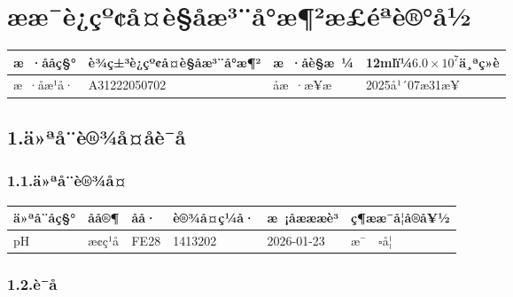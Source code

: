 \documentclass[UTF8,10pt,a4paper,fontset=fandol]{ctexart}
\newcommand{\fieldvalue}[1]{#1}
\newcommand{\handwritten}[1]{#1}
\begin{document}
\newpage

\section*{ææ¯è¿çº¢å¤è§åæ³¨å°æ¶²æ£éªè®°å½}

\begin{tabular}{|p{3cm}|p{5cm}|p{3cm}|p{5cm}|}
\hline
æ ·ååç§° &
\fieldvalue{è¾ç±³è¿çº¢å¤è§åæ³¨å°æ¶²} &
æ ·åè§æ ¼ &
\fieldvalue{12mlï¼$6.0\times10^{7}$ä¸ªç»è}
\\ \hline
æ ·åæ¹å· &
\fieldvalue{\handwritten{A31222050702}} &
åæ ·æ¥æ &
\fieldvalue{\handwritten{2025å¹´07æ31æ¥}}
\\ \hline
\end{tabular}

\subsection*{1.\quad ä»ªå¨è®¾å¤åè¯å}

\subsubsection*{1.1.\quad ä»ªå¨è®¾å¤}

\begin{tabular}{|p{2.2cm}|p{2.7cm}|p{2.2cm}|p{2.7cm}|p{3cm}|p{2.8cm}|}
\hline
ä»ªå¨åç§° & åå®¶ & åå· & è®¾å¤ç¼å· & æ ¡åæææè³ & ç¶ææ¯å¦å®å¥½
\\ \hline
\fieldvalue{pH} &
\fieldvalue{æ¢ç¹å} &
\fieldvalue{FE28} &
\fieldvalue{1413202} &
\fieldvalue{\handwritten{2026-01-23}} &
\fieldvalue{æ¯}\ \ $\square$å¦
\\ \hline
\end{tabular}

\subsubsection*{1.2.\quad è¯å}
\end{document}
